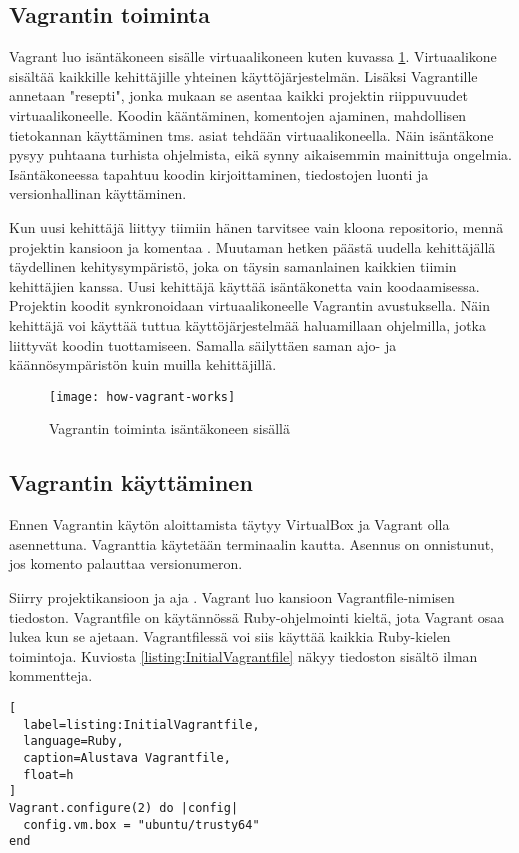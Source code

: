 \subsection{Vagrantin toiminta}
Vagrant luo isäntäkoneen sisälle virtuaalikoneen kuten kuvassa \ref{fig:how-vagrant-works}. Virtuaalikone sisältää kaikkille kehittäjille yhteinen käyttöjärjestelmän. Lisäksi Vagrantille annetaan "resepti", jonka mukaan se asentaa kaikki projektin riippuvuudet virtuaalikoneelle. Koodin kääntäminen, komentojen ajaminen, mahdollisen tietokannan käyttäminen tms. asiat tehdään virtuaalikoneella. Näin isäntäkone pysyy puhtaana turhista ohjelmista, eikä synny aikaisemmin mainittuja ongelmia. Isäntäkoneessa tapahtuu koodin kirjoittaminen, tiedostojen luonti ja versionhallinan käyttäminen.

Kun uusi kehittäjä liittyy tiimiin hänen tarvitsee vain kloona repositorio, mennä projektin kansioon ja komentaa . Muutaman hetken päästä uudella kehittäjällä täydellinen kehitysympäristö, joka on täysin samanlainen kaikkien tiimin kehittäjien kanssa. Uusi kehittäjä käyttää isäntäkonetta vain koodaamisessa. Projektin koodit synkronoidaan virtuaalikoneelle Vagrantin avustuksella. Näin kehittäjä voi käyttää tuttua käyttöjärjestelmää haluamillaan ohjelmilla, jotka liittyvät koodin tuottamiseen. Samalla säilyttäen saman ajo- ja käännösympäristön kuin muilla kehittäjillä.

\begin{figure}[h]
  \texttt{[image: how-vagrant-works]}
  \caption{Vagrantin toiminta isäntäkoneen sisällä}
  \label{fig:how-vagrant-works}
\end{figure}

\subsection{Vagrantin käyttäminen}
Ennen Vagrantin käytön aloittamista täytyy VirtualBox ja Vagrant olla asennettuna. Vagranttia käytetään terminaalin kautta. Asennus on onnistunut, jos komento  palauttaa versionumeron.

Siirry projektikansioon ja aja . Vagrant luo kansioon Vagrantfile-nimisen tiedoston. Vagrantfile on käytännössä Ruby-ohjelmointi kieltä, jota Vagrant osaa lukea kun se ajetaan. Vagrantfilessä voi siis käyttää kaikkia Ruby-kielen toimintoja. Kuviosta \ref{listing:InitialVagrantfile} näkyy tiedoston sisältö ilman kommentteja.

\begin{lstlisting}[
  label=listing:InitialVagrantfile,
  language=Ruby,
  caption=Alustava Vagrantfile,
  float=h
]
Vagrant.configure(2) do |config|
  config.vm.box = "ubuntu/trusty64"
end
\end{lstlisting}

